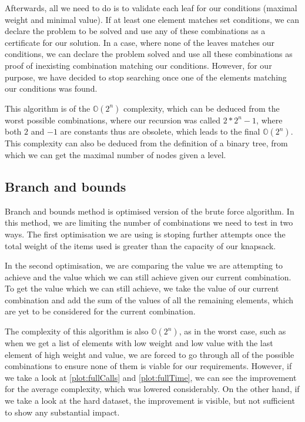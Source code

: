 \newpage
Afterwards, all we need to do is to validate each leaf for our conditions (maximal weight and minimal value). If at least one element matches set conditions, we can declare the problem to be solved and use any of these combinations as a certificate for our solution. In a case, where none of the leaves matches our conditions, we can declare the problem solved and use all these combinations as proof of inexisting combination matching our conditions. However, for our purpose, we have decided to stop searching once one of the elements matching our conditions was found.

This algorithm is of the $\mathbb{O}(2^n)$ complexity, which can be deduced from the worst possible combinations, where our recursion was called $2*2^n-1$, where both $2$ and $-1$ are constants thus are obsolete, which leads to the final $\mathbb{O}(2^n)$.  This complexity can also be deduced from the definition of a binary tree, from which we can get the maximal number of nodes given a level.

\subsection{Branch and bounds}
Branch and bounds method is optimised version of the brute force algorithm. In this method, we are limiting the number of combinations we need to test in two ways. The first optimisation we are using is stoping further attempts once the total weight of the items used is greater than the capacity of our knapsack.

In the second optimisation, we are comparing the value we are attempting to achieve and the value which we can still achieve given our current combination. To get the value which we can still achieve, we take the value of our current combination and add the sum of the values of all the remaining elements, which are yet to be considered for the current combination.

The complexity of this algorithm is also $\mathbb{O}(2^n)$, as in the worst case, such as when we get a list of elements with low weight and low value with the last element of high weight and value, we are forced to go through all of the possible combinations to ensure none of them is viable for our requirements. However, if we take a look at \cref{plot:fullCalls} and \cref{plot:fullTime}, we can see the improvement for the average complexity, which was lowered considerably. On the other hand, if we take a look at the hard dataset, the improvement is visible, but not sufficient to show any substantial impact.

